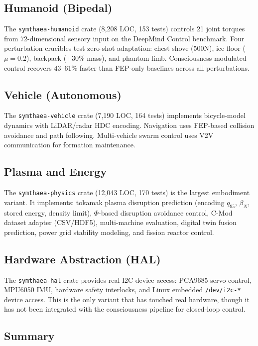 \documentclass[11pt,twocolumn]{article}
\begin{document}
\subsection{Humanoid (Bipedal)}

The \texttt{symthaea-humanoid} crate (8,208 LOC, 153 tests) controls 21 joint torques from 72-dimensional sensory input on the DeepMind Control benchmark. Four perturbation crucibles test zero-shot adaptation: chest shove (500N), ice floor ($\mu = 0.2$), backpack (+30\% mass), and phantom limb. Consciousness-modulated control recovers 43--61\% faster than FEP-only baselines across all perturbations.

\subsection{Vehicle (Autonomous)}

The \texttt{symthaea-vehicle} crate (7,190 LOC, 164 tests) implements bicycle-model dynamics with LiDAR/radar HDC encoding. Navigation uses FEP-based collision avoidance and path following. Multi-vehicle swarm control uses V2V communication for formation maintenance.

\subsection{Plasma and Energy}

The \texttt{symthaea-physics} crate (12,043 LOC, 170 tests) is the largest embodiment variant. It implements: tokamak plasma disruption prediction (encoding $q_{95}$, $\beta_N$, stored energy, density limit), $\Phi$-based disruption avoidance control, C-Mod dataset adapter (CSV/HDF5), multi-machine evaluation, digital twin fusion prediction, power grid stability modeling, and fission reactor control.

\subsection{Hardware Abstraction (HAL)}

The \texttt{symthaea-hal} crate provides real I2C device access: PCA9685 servo control, MPU6050 IMU, hardware safety interlocks, and Linux embedded \texttt{/dev/i2c-*} device access. This is the only variant that has touched real hardware, though it has not been integrated with the consciousness pipeline for closed-loop control.

\subsection{Summary}
\end{document}
